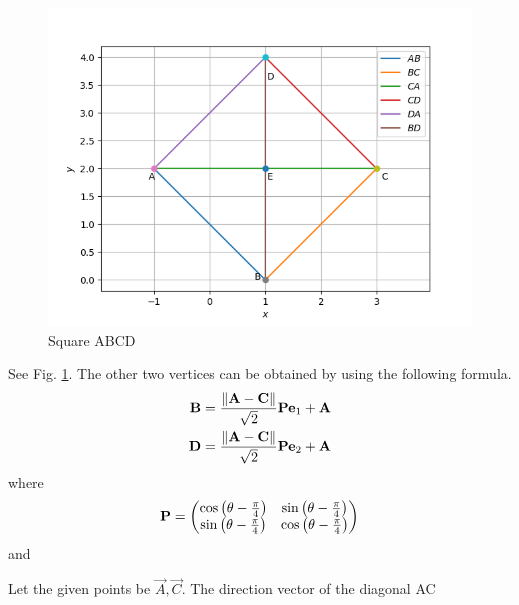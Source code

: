 \begin{figure}[!ht]
\centering
\includegraphics[width= \columnwidth]{solutions/1/4/quad.png}
\caption{Square ABCD}
\label{fig:2.2.7}
\end{figure}
See Fig. \ref{fig:2.2.7}.
The other two vertices can be obtained by using the following formula. 
\begin{align}
  \label{eq:square_points}
  \mathbf{B} = \frac{\left\lVert\mathbf{A}-\mathbf{C}\right\rVert}{\sqrt{2}} \mathbf{P}\mathbf{e}_1+\mathbf{A}
  \\
  \mathbf{D} = \frac{\left\lVert\mathbf{A}-\mathbf{C}\right\rVert}{\sqrt{2}} \mathbf{P}\mathbf{e}_2+\mathbf{A}
\end{align}
where 
\begin{align}
	\mathbf{P} = \begin{pmatrix}\cos \left(\theta-\frac{\pi}{4}\right) & \sin  \left(\theta-\frac{\pi}{4}\right) \\ \sin \left(\theta-\frac{\pi}{4}\right) & \cos \left(\theta-\frac{\pi}{4}\right)\end{pmatrix}
\end{align}
and 



Let the given points be $\vec{A}, \vec{C}$.  The direction vector of the diagonal AC



